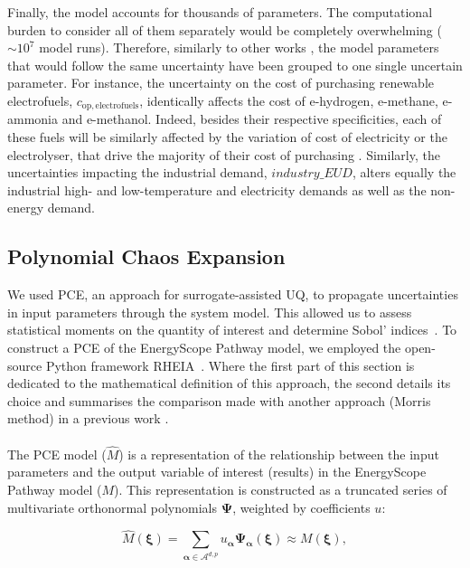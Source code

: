Finally, the model accounts for thousands of parameters. The computational burden to consider all of them separately would be completely overwhelming ($\sim 10^7$ model runs). Therefore, similarly to other works \cite{Moret2017,limpens2020impact}, the model parameters that would follow the same uncertainty have been grouped to one single uncertain parameter. For instance, the uncertainty on the cost of purchasing renewable electrofuels, $c_{\mathrm{op,electrofuels}}$, identically affects the cost of e-hydrogen, e-methane, e-ammonia and e-methanol. Indeed, besides their respective specificities, each of these fuels will be similarly affected by the variation of cost of electricity or the electrolyser, that drive the majority of their cost of purchasing \cite{h2coalition}. Similarly, the uncertainties impacting the industrial demand, $industry\_EUD$, alters equally the industrial high- and low-temperature and electricity demands as well as the non-energy demand.

\subsection{Polynomial Chaos Expansion}
\label{subsec:pce}

We used \gls{PCE}, an approach for surrogate-assisted \gls{UQ}, to propagate uncertainties in input parameters through the system model. This allowed us to assess statistical moments on the quantity of interest and determine Sobol' indices~\cite{coppitters2020robust}. To construct a PCE of the EnergyScope Pathway model, we employed the open-source Python framework RHEIA~\cite{coppitters2022rheia,readthedocs_rheia}. Where the first part of this section is dedicated to the mathematical definition of this approach, the second details its choice and summarises the comparison made with another approach (\ie Morris method) in a previous work \cite{limpens2020impact}.\\

\\

\noindent
The PCE model ($\hat{M}$) is a representation of the relationship between the input parameters and the output variable of interest (\ie results) in the EnergyScope Pathway model ($M$). This representation is constructed as a truncated series of multivariate orthonormal polynomials $\bm{\Psi}$, weighted by coefficients $u$:

\begin{equation}
\hat{M} \left( \bm{\xi} \right) = \sum_{\bm{\alpha} \in \mathcal{A}^{d,p}} u_{\bm{\alpha}} \bm{\Psi}_{\bm{\alpha}} \left( \bm{\xi} \right) \approx M \left( \bm{\xi} \right), 
\end{equation}

